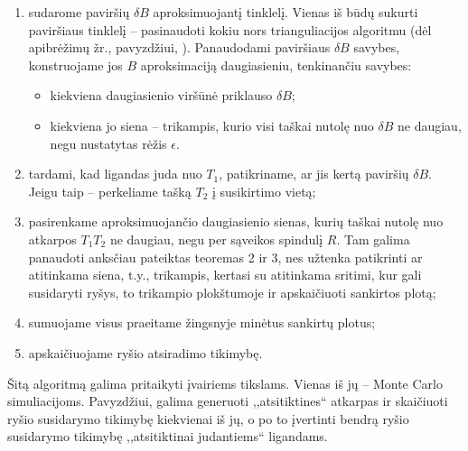 \documentclass[10pt]{article}
\begin{document}
\begin{enumerate}
\item sudarome paviršių $ \delta B $ aproksimuojantį tinklelį. Vienas iš būdų sukurti paviršiaus tinklelį -- pasinaudoti kokiu nors trianguliacijos algoritmu (dėl apibrėžimų žr., pavyzdžiui, \cite{Trian10}  ). Panaudodami  paviršiaus $ \delta B $ savybes, konstruojame jos $ B $ aproksimaciją daugiasieniu, tenkinančiu savybes:
\begin{itemize}

\item kiekviena daugiasienio viršūnė priklauso $ \delta B $;

\item kiekviena jo siena -- trikampis, kurio visi taškai nutolę nuo $ \delta B $ ne daugiau, negu nustatytas rėžis $ \epsilon $.

\end{itemize}

\item tardami, kad ligandas juda nuo $ T_1 $, patikriname, ar jis kertą paviršių $ \delta B $. Jeigu taip -- perkeliame tašką $ T_2 $ į susikirtimo vietą;

\item pasirenkame aproksimuojančio daugiasienio sienas, kurių taškai nutolę nuo atkarpos $ T_{1}T_{2} $ ne daugiau, negu per sąveikos spindulį $ R $. Tam galima panaudoti anksčiau pateiktas teoremas 2 ir 3, nes užtenka patikrinti ar atitinkama siena, t.y., trikampis, kertasi su atitinkama sritimi, kur gali susidaryti ryšys,  to trikampio  plokštumoje ir apskaičiuoti sankirtos plotą;

\item sumuojame visus praeitame žingsnyje minėtus sankirtų plotus;

\item apskaičiuojame ryšio atsiradimo tikimybę.
   
\end{enumerate}



Šitą algoritmą galima pritaikyti įvairiems tikslams. Vienas iš jų -- Monte Carlo simuliacijoms. Pavyzdžiui, galima generuoti ,,atsitiktines`` atkarpas ir skaičiuoti ryšio susidarymo tikimybę kiekvienai iš jų, o po to įvertinti bendrą ryšio susidarymo tikimybę ,,atsitiktinai judantiems`` ligandams.
\end{document}
